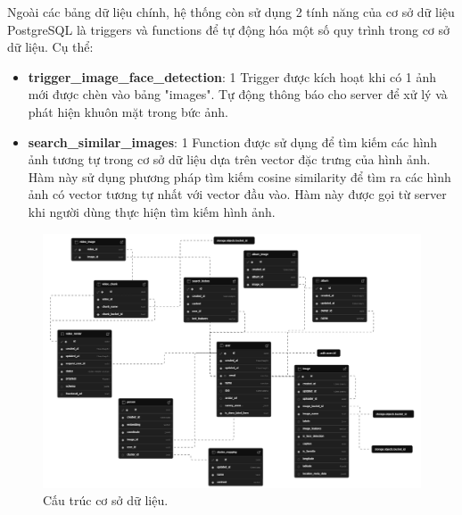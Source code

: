 Ngoài các bảng dữ liệu chính, hệ thống còn sử dụng 2 tính năng của cơ sở dữ liệu PostgreSQL là triggers và functions để tự động hóa một số quy trình trong cơ sở dữ liệu. Cụ thể:
\begin{itemize}
    \item \textbf{trigger\_image\_face\_detection}: 1 Trigger được kích hoạt khi có 1 ảnh mới được chèn vào bảng "images". Tự động thông báo cho server để xử lý và phát hiện khuôn mặt trong bức ảnh.
    
    
    \item \textbf{search\_similar\_images}: 1 Function được sử dụng để tìm kiếm các hình ảnh tương tự trong cơ sở dữ liệu dựa trên vector đặc trưng của hình ảnh. Hàm này sử dụng phương pháp tìm kiếm cosine similarity để tìm ra các hình ảnh có vector tương tự nhất với vector đầu vào. Hàm này được gọi từ server khi người dùng thực hiện tìm kiếm hình ảnh. 
    
\end{itemize}

\begin{figure}[H]
    \centering  
    \includegraphics[width=1\textwidth]{figures/c3/3-4-database-graph.png}
    \caption{Cấu trúc cơ sở dữ liệu.}
    \label{fig:3-4-database-diagram}
\end{figure}